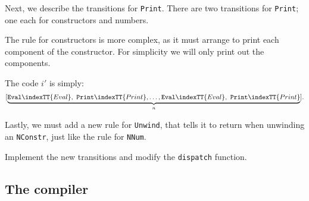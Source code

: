 \gmruleod%
{}%
{}

Next, we describe the transitions for \mbox{\tt Print}. There are two
transitions for \mbox{\tt Print}; one each for constructors and numbers.

\gmruleod%
{}%
{}

The rule for constructors is more complex, as it must arrange to print
each component of the constructor. For simplicity we will only print
out the components.

\gmruleod%
{}%
{}

The code $i'$ is simply:
\[ [\underbrace{\mbox{\tt Eval}\indexTT{Eval},\ \mbox{\tt Print}\indexTT{Print}, \ldots, \mbox{\tt Eval}\indexTT{Eval},\ \mbox{\tt Print}\indexTT{Print}}_n ].\]

Lastly, we must add a new rule for \mbox{\tt Unwind}, that tells it to return
when unwinding an \mbox{\tt NConstr}, just like the rule for \mbox{\tt NNum}.
\gmruled%
{}%
{}

\begin{exercise}\label{gm:X:step6}
Implement the new transitions and modify the \mbox{\tt dispatch} function.
\end{exercise}

\subsection{The compiler}

